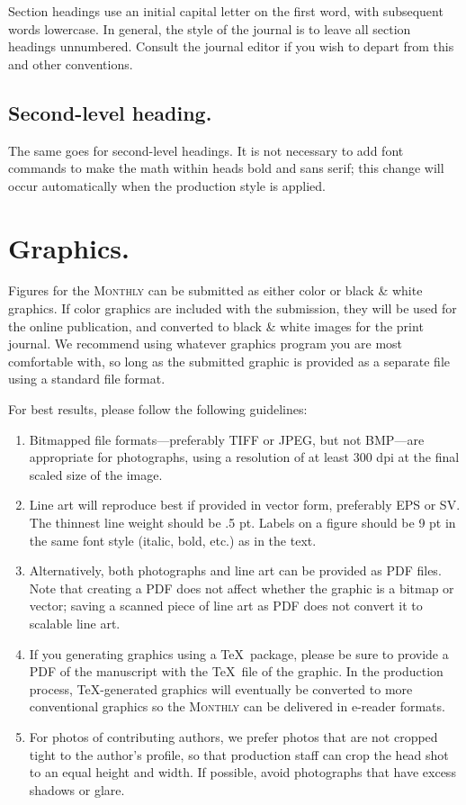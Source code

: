 \documentclass{article}
\theoremstyle{theorem}
\theoremstyle{definition}
\begin{document}
Section headings use an initial capital letter on the first word, with subsequent words lowercase.  In general, the style of the journal is to leave all section headings unnumbered.  Consult the journal editor if you wish to depart from this and other conventions.

\subsection{Second-level heading.}

The same goes for second-level headings.  It is not necessary to add font commands to make the math within heads bold and sans serif; this change will occur automatically when the production style is applied.

\section{Graphics.}

Figures for the \textsc{Monthly} can be submitted as either color or black \& white graphics.  If color graphics are included with the submission, they will be used for the online publication, and converted to black \& white images for the print journal.  We recommend using whatever graphics program you are most comfortable with, so long as the submitted graphic is provided as a separate file using a standard file format.

For best results, please follow the following guidelines:
\begin{enumerate}
\item Bitmapped file formats---preferably TIFF or JPEG, but not BMP---are appropriate for photographs, using a resolution of at least 300 dpi at the final scaled size of the image.
\item Line art will reproduce best if provided in vector form, preferably EPS or SV. The thinnest line weight should be .5 pt.  Labels on a figure should be 9 pt in the same font style (italic, bold, etc.) as in the text.
\item Alternatively, both photographs and line art can be provided as PDF files.  Note that creating a PDF does not affect whether the graphic is a bitmap or vector; saving a scanned piece of line art as PDF does not convert it to scalable line art.
\item If you generating graphics using a \TeX\ package, please be sure to provide a PDF of the manuscript with the \TeX\ file of the graphic.  In the production process, \TeX-generated graphics will eventually be converted to more conventional graphics so the \textsc{Monthly} can be delivered in e-reader formats.
\item For photos of contributing authors, we prefer photos that are not cropped tight to the author's profile, so that production staff can crop the head shot to an equal height and width.  If possible, avoid photographs that have excess shadows or glare.
\end{enumerate}
\end{document}
